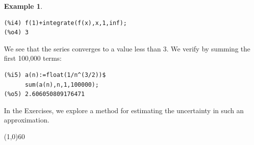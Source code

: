 \documentclass[10.5pt,twoside]{report}
\theoremstyle{definition}
\newtheorem{exmp}{Example}[section]
\begin{document}
\begin{exmp}
\begin{verbatim}
(%i4) f(1)+integrate(f(x),x,1,inf);
(%o4) 3
\end{verbatim}

We see that the series converges to a value less than 3.  We verify by summing the first 100,000 terms:

\begin{verbatim}
(%i5) a(n):=float(1/n^(3/2))$
      sum(a(n),n,1,100000);
(%o5) 2.606050809176471
\end{verbatim}

In the Exercises, we explore a method for estimating the uncertainty in such an approximation.


\end{exmp}

\line(1,0){60}
\linethickness{0.5mm}
\end{document}
